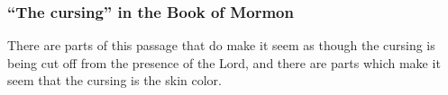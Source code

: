 		
	\subsubsection{``The cursing'' in the Book of Mormon}
		\label{CURSE-bom}
		
		\begin{compactdesc}
			\item[{\hyperref[2NEPHI-5-19]{2 Nephi 5:19--25}}]
				\begin{compactitem}
					\item There are parts of this passage that do make it seem as though the cursing is being cut off from the presence of the Lord, and there are parts which make it seem that the cursing is the skin color.
				\end{compactitem}
		\end{compactdesc}